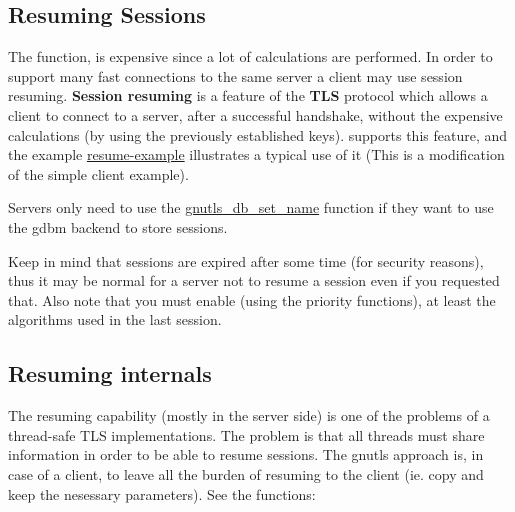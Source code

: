 \subsection{Resuming Sessions}
\par
The 
 function, is expensive since a lot of calculations are performed. In order to support many fast connections to
the same server a client may use session resuming. {\bf Session resuming} is a
feature of the {\bf TLS} protocol which allows a client to connect to a server,
after a successful handshake, without the expensive calculations (by using the previously
established keys). \gnutls{} supports this feature, and the
example \hyperref{resume client}{resume client (see Section }{)}{resume-example} illustrates a typical use of it (This is a modification of the simple client example).
\par
Servers only need to use the
\hyperref{gnutls\_db\_set\_name()}{gnutls\_db\_set\_name() (see Section }{)}{gnutls_db_set_name} function if they want to use the gdbm
backend to store sessions. 
\par
Keep in mind that sessions are expired after some time (for security reasons), thus
it may be normal for a server not to resume a session even if you requested that.
Also note that you must enable (using the priority functions), at least the
algorithms used in the last session.

\subsection{Resuming internals}
The resuming capability (mostly in the server side) is one of the problems of a thread-safe TLS
implementations. The problem is that all threads must share information in
order to be able to resume sessions. The gnutls approach is, in case of a
client, to leave all the burden of resuming to the client (ie. copy and keep the
nesessary parameters). See the functions:

